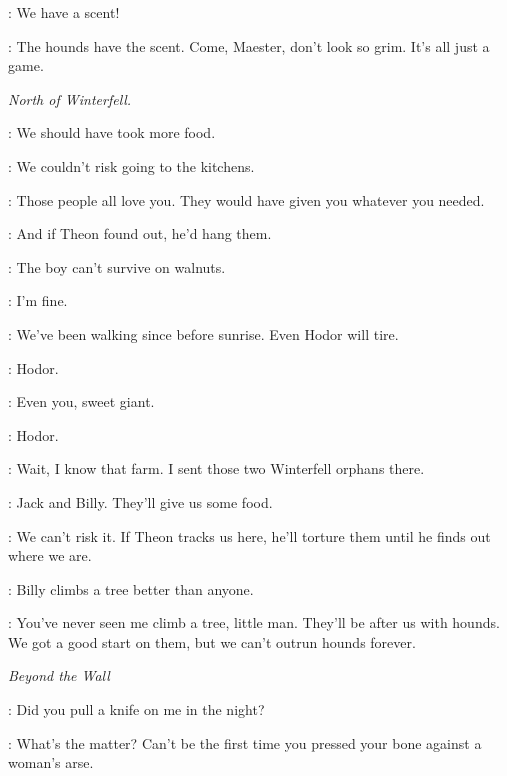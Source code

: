 
\DAGMER: We have a scent!

\THEON: The hounds have the scent. Come, Maester, don't look so grim. It's all just a game.


\scene

\textit{North of Winterfell.}


\OSHA: We should have took more food.

\BRAN: We couldn't risk going to the kitchens.

\OSHA: Those people all love you. They would have given you whatever you needed.

\BRAN: And if Theon found out, he'd hang them.

\OSHA: The boy can't survive on walnuts.

\RICKON: I'm fine.

\OSHA: We've been walking since before sunrise. Even Hodor will tire.

\HODOR: Hodor.

\OSHA: Even you, sweet giant.

\HODOR:  Hodor.


\BRAN: Wait, I know that farm. I sent those two Winterfell orphans there.

\RICKON: Jack and Billy. They'll give us some food.

\BRAN: We can't risk it. If Theon tracks us here, he'll torture them until he finds out where we are.

\RICKON: Billy climbs a tree better than anyone.

\OSHA: You've never seen me climb a tree, little man. They'll be after us with hounds. We got a good start on them, but we can't outrun hounds forever.



\scene

\textit{Beyond the Wall}


\YGRITTE: Did you pull a knife on me in the night?


\YGRITTE: What's the matter? Can't be the first time you pressed your bone against a woman's arse.

